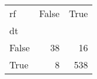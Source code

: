 \begin{tabular}{lrr}
\toprule
rf &  False &  True  \\
dt    &        &        \\
\midrule
False &     38 &     16 \\
True  &      8 &    538 \\
\bottomrule
\end{tabular}
